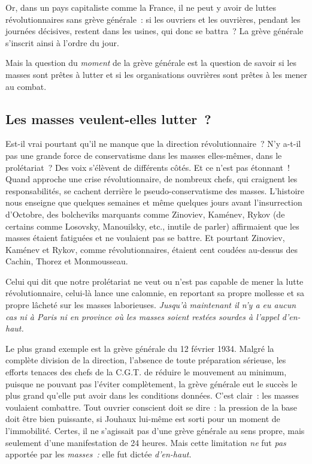 \documentclass[french,twoside]{book} %
\begin{document}
Or, dans un pays capitaliste comme la France, il ne peut y avoir de luttes révolutionnaires sans grève générale : si les ouvriers et les ouvrières, pendant les journées décisives, restent dans les usines, qui donc se battra ? La grève générale s’inscrit ainsi à l’ordre du jour.\par
Mais la question du \emph{moment} de la grève générale est la question de savoir si les masses sont prêtes à lutter et si les organisations ouvrières sont prêtes à les mener au combat.
\subsection[{Les masses veulent-elles lutter ?}]{Les masses veulent-elles lutter ?}
\noindent Est-il vrai pourtant qu’il ne manque que la direction révolutionnaire ? N’y a-t-il pas une grande force de conservatisme dans les masses elles-mêmes, dans le prolétariat ? Des voix s’élèvent de différents côtés. Et ce n’est pas étonnant ! Quand approche une crise révolutionnaire, de nombreux chefs, qui craignent les responsabilités, se cachent derrière le pseudo-conservatisme des masses. L’histoire nous enseigne que quelques semaines et même  quelques jours avant l’insurrection d’Octobre, des bolcheviks marquants comme Zinoviev, Kaménev, Rykov (de certains comme Losovsky, Manouilsky, etc., inutile de parler) affirmaient que les masses étaient fatiguées et ne voulaient pas se battre. Et pourtant Zinoviev, Kaménev et Rykov, comme révolutionnaires, étaient cent coudées au-dessus des Cachin, Thorez et Monmousseau.\par
Celui qui dit que notre prolétariat ne veut ou n’est pas capable de mener la lutte révolutionnaire, celui-là lance une calomnie, en reportant sa propre mollesse et sa propre lâcheté sur les masses laborieuses. \emph{Jusqu’à maintenant il n’y a eu aucun cas ni à Paris ni en province où les masses soient restées sourdes à l’appel d’en-haut.}\par
Le plus grand exemple est la grève générale du 12 février 1934. Malgré la complète division de la direction, l’absence de toute préparation sérieuse, les efforts tenaces des chefs de la C.G.T. de réduire le mouvement au minimum, puisque ne pouvant pas l’éviter complètement, la grève générale eut le succès le plus grand qu’elle put avoir dans les conditions données. C’est clair : les masses voulaient combattre. Tout ouvrier conscient doit se dire : la pression de la base doit être bien puissante, si Jouhaux lui-même est sorti pour un moment de l’immobilité. Certes, il ne s’agissait pas d’une grève générale au sens propre, mais seulement d’une manifestation de 24 heures. Mais cette limitation \emph{ne} fut \emph{pas} apportée par les \emph{masses :} elle fut dictée \emph{d’en-haut.}\par
\end{document}
